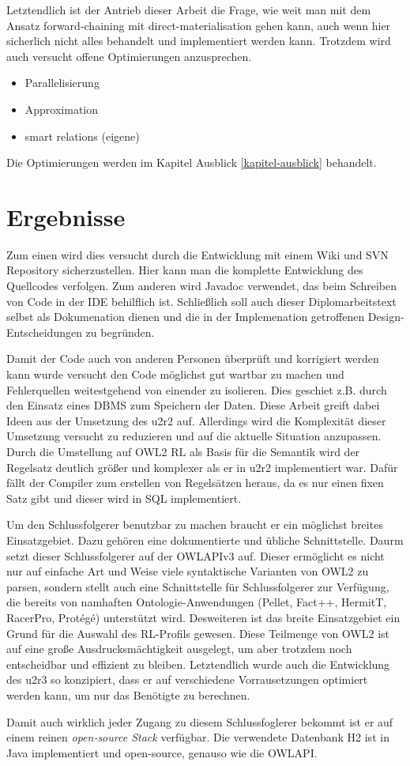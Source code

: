 Letztendlich ist der Antrieb dieser Arbeit die Frage, wie weit man mit dem Ansatz forward-chaining mit direct-materialisation gehen kann, auch wenn hier sicherlich nicht alles behandelt und implementiert werden kann. Trotzdem wird auch versucht offene Optimierungen anzusprechen.

\begin{itemize}
  \item Parallelisierung
  \item Approximation
  \item smart relations (eigene)
\end{itemize}

Die Optimierungen werden im Kapitel Ausblick \ref{kapitel-ausblick} behandelt.

\section{Ergebnisse}
Zum einen wird dies versucht durch die Entwicklung mit einem Wiki und SVN Repository sicherzustellen. Hier kann man die komplette Entwicklung des Quellcodes verfolgen. Zum anderen wird Javadoc verwendet, das beim Schreiben von Code in der IDE behilflich ist. Schließlich soll auch dieser Diplomarbeitstext selbst als Dokumenation dienen und die in der Implemenation getroffenen Design-Entscheidungen zu begründen.

Damit der Code auch von anderen Personen überprüft und korrigiert werden kann wurde versucht den Code möglichst gut wartbar zu machen und Fehlerquellen weitestgehend von einender zu isolieren. Dies geschiet z.B. durch den Einsatz eines DBMS zum Speichern der Daten. Diese Arbeit greift dabei Ideen aus der Umsetzung des u2r2 \cite{Weithoehner2008} auf.
Allerdings wird die Komplexität dieser Umsetzung versucht zu reduzieren und auf die aktuelle Situation anzupassen. Durch die Umstellung auf OWL2 RL als Basis für die Semantik wird der Regelsatz deutlich größer und komplexer als er in u2r2 implementiert war. Dafür fällt der Compiler zum erstellen von Regelsätzen heraus, da es nur einen fixen Satz gibt und dieser wird in SQL implementiert.

Um den Schlussfolgerer benutzbar zu machen braucht er ein möglichst breites Einsatzgebiet. Dazu gehören eine dokumentierte und übliche Schnittstelle. Daurm setzt dieser Schlussfolgerer auf der OWLAPIv3 \cite{OWLAPI} auf. Dieser ermöglicht es nicht nur auf einfache Art und Weise viele syntaktische Varianten von OWL2 zu parsen, sondern stellt auch eine Schnittstelle für Schlussfolgerer zur Verfügung, die bereits von namhaften Ontologie-Anwendungen (Pellet, Fact++, HermitT, RacerPro, Protégé) unterstützt wird. Desweiteren ist das breite Einsatzgebiet ein Grund für die Auswahl des RL-Profils gewesen. Diese Teilmenge von OWL2 ist auf eine große Ausdrucksmächtigkeit ausgelegt, um aber trotzdem noch entscheidbar und effizient zu bleiben. Letztendlich wurde auch die Entwicklung des u2r3 so konzipiert, dass er auf verschiedene Vorrausetzungen optimiert werden kann, um nur das Benötigte zu berechnen.

Damit auch wirklich jeder Zugang zu diesem Schlussfoglerer bekommt ist er auf einem reinen \emph{open-source Stack} verfügbar. Die verwendete Datenbank H2 ist in Java implementiert und open-source, genauso wie die OWLAPI.
